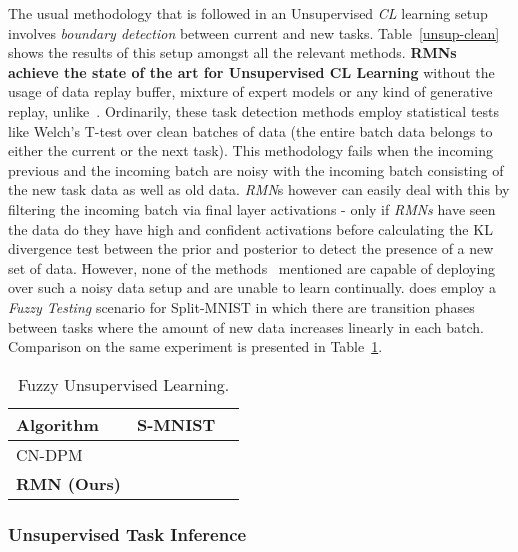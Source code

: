 \documentclass{article}
\begin{document}
The usual methodology that is followed in an Unsupervised \textit{CL} learning setup involves \textit{boundary detection} between current and new tasks. Table~\ref{unsup-clean} shows the results of this setup amongst all the relevant methods. \textbf{RMNs achieve the state of the art for Unsupervised CL Learning} without the usage of data replay buffer, mixture of expert models or any kind of generative replay, unlike~\cite{titsias2019functional, pan2021continual, lee_continual_2020}.
Ordinarily, these task detection methods employ statistical tests like Welch's T-test over clean batches of data (the entire batch data belongs to either the current or the next task). This methodology fails when the incoming previous and the incoming batch are noisy with the incoming batch consisting of the new task data as well as old data. \textit{RMN}s however can easily deal with this by filtering the incoming batch via final layer activations - only if \textit{RMNs} have seen the data do they have high and confident activations before calculating the KL divergence test between the prior and posterior to detect the presence of a new set of data. However, none of the methods~\cite{titsias2019functional, lee_continual_2020} mentioned are capable of deploying over such a noisy data setup and are unable to learn continually. \cite{lee_continual_2020} does employ a \textit{Fuzzy Testing} scenario for Split-MNIST in which there are transition phases between tasks where the amount of new data increases linearly in each batch. Comparison on the same experiment is presented in Table~\ref{noisycrsplit}.

\begin{table}
\caption{Fuzzy Unsupervised Learning.}
\label{noisycrsplit}
\begin{center}
\begin{small}
\begin{sc}
\begin{tabular}{lcc}
\toprule
Algorithm &  S-MNIST \\
\midrule
CN-DPM\tnote{} &  \\
\textbf{RMN (Ours)} &  \\
\bottomrule
\end{tabular}
\end{sc}
\end{small}
\end{center}
\vskip -0.27in
\end{table}

\subsubsection{Unsupervised Task Inference} 
\end{document}
